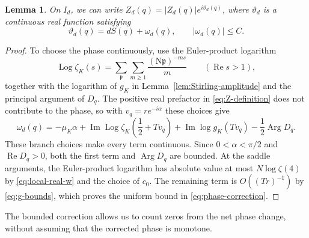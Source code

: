 \documentclass[11pt,reqno]{amsart}
\numberwithin{equation}{section}
\newtheorem{lemma}[theorem]{Lemma}
\DeclareMathOperator{\Log}{Log}
\DeclareMathOperator{\Arg}{Arg}
\renewcommand{\Re}{\operatorname{Re}}
\renewcommand{\Im}{\operatorname{Im}}
\begin{document}
\begin{lemma}\label{lem:phase-correction}
On $I_d$, we can write $Z_d(q)=|Z_d(q)|e^{i\vartheta_d(q)}$,
where $\vartheta_d$ is a continuous real function satisfying
\begin{equation}\label{eq:phase-correction}
 \vartheta_d(q)=dS(q)+\omega_d(q),\qquad |\omega_d(q)|\le C.
\end{equation}
\end{lemma}

\begin{proof}
To choose the phase continuously, use the Euler-product logarithm
\[
 \Log\zeta_K(s)=\sum_{\mathfrak p}\sum_{m\ge1}
               \frac{(\mathrm N\mathfrak p)^{-ms}}m
 \qquad(\Re s>1),
\]
together with the logarithm of $g_K$ in
Lemma~\ref{lem:Stirling-amplitude} and the principal argument
of $D_q$. The positive real prefactor in
\eqref{eq:Z-definition} does not contribute to the phase, so with
$v_q=re^{-i\alpha}$ these choices give
\begin{equation}\label{eq:omega-formula}
 \omega_d(q)=-\mu_K\alpha
  +\Im\Log\zeta_K\!\left(\frac12+Tv_q\right)
  +\Im\log g_K(Tv_q)-\frac12\Arg D_q.
\end{equation}
These branch choices make every term continuous. Since
$0<\alpha<\pi/2$ and $\Re D_q>0$, both the first term and
$\Arg D_q$ are bounded. At the saddle arguments, the Euler-product
logarithm has absolute value at most $N\log\zeta(4)$ by
\eqref{eq:local-real-w} and the choice of $c_0$.
The remaining term is $O((Tr)^{-1})$ by \eqref{eq:g-bounds},
which proves the uniform bound in \eqref{eq:phase-correction}.
\end{proof}

The bounded correction allows us to count zeros from the net phase
change, without assuming that the corrected phase is monotone.
\end{document}
